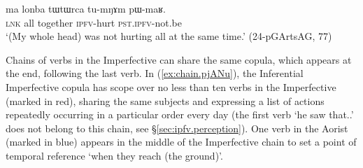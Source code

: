 \begin{exe}
\ex \label{ex:tumNAm.pWmaR}
\gll  ma lonba tɯtɯrca tu-mŋɤm pɯ-maʁ. \\
\textsc{lnk} all together \textsc{ipfv}-hurt \textsc{pst}.\textsc{ipfv}-not.be \\
\glt `(My whole head) was not hurting all at the same time.' (24-pGArtsAG, 77)
\end{exe}

Chains of verbs in the Imperfective can share the same copula, which appears at the end, following the last verb. In (\ref{ex:chain.pjANu}), the Inferential Imperfective copula  has scope over no less than ten verbs in the Imperfective (marked in red), sharing the same subjects and expressing a list of actions repeatedly occurring in a particular order every day (the first verb  `he saw that..' does not belong to this chain, see §\ref{sec:ipfv.perception}). One verb in the Aorist (marked in blue) appears in the middle of the Imperfective chain to set a point of temporal reference `when they reach (the ground)'.

